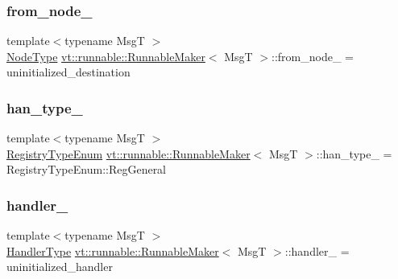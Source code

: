 \subsubsection{\texorpdfstring{from\+\_\+node\+\_\+}{from\_node\_}}
{\footnotesize\ttfamily template$<$typename MsgT $>$ \\
\hyperlink{namespacevt_a866da9d0efc19c0a1ce79e9e492f47e2}{Node\+Type} \hyperlink{structvt_1_1runnable_1_1_runnable_maker}{vt\+::runnable\+::\+Runnable\+Maker}$<$ MsgT $>$\+::from\+\_\+node\+\_\+ = uninitialized\+\_\+destination\hspace{0.3cm}{\ttfamily [private]}}

\mbox{\label{structvt_1_1runnable_1_1_runnable_maker_afb8a21bfcf5a2a36a3d18dec16d422c8}} 
\subsubsection{\texorpdfstring{han\+\_\+type\+\_\+}{han\_type\_}}
{\footnotesize\ttfamily template$<$typename MsgT $>$ \\
\hyperlink{namespacevt_1_1auto__registry_a9f369ca2b484130b396729e2ddf05241}{Registry\+Type\+Enum} \hyperlink{structvt_1_1runnable_1_1_runnable_maker}{vt\+::runnable\+::\+Runnable\+Maker}$<$ MsgT $>$\+::han\+\_\+type\+\_\+ = Registry\+Type\+Enum\+::\+Reg\+General\hspace{0.3cm}{\ttfamily [private]}}

\mbox{\label{structvt_1_1runnable_1_1_runnable_maker_a627ad83f0608f9b91c5ecedecf2f8d75}} 
\subsubsection{\texorpdfstring{handler\+\_\+}{handler\_}}
{\footnotesize\ttfamily template$<$typename MsgT $>$ \\
\hyperlink{namespacevt_af64846b57dfcaf104da3ef6967917573}{Handler\+Type} \hyperlink{structvt_1_1runnable_1_1_runnable_maker}{vt\+::runnable\+::\+Runnable\+Maker}$<$ MsgT $>$\+::handler\+\_\+ = uninitialized\+\_\+handler\hspace{0.3cm}{\ttfamily [private]}}

